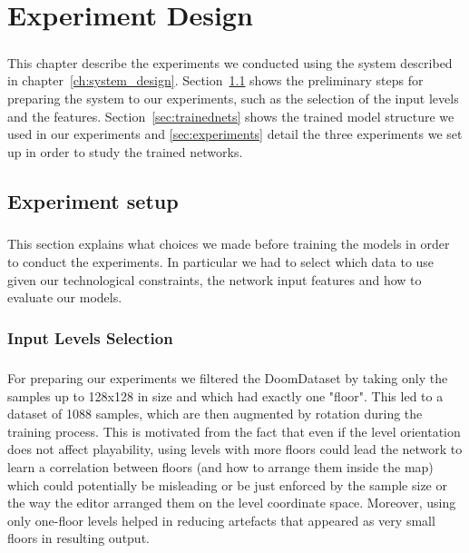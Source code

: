 \chapter{Experiment Design}
\label{ch:experiment}
\paragraph{} This chapter describe the experiments we conducted using the system described in chapter~\ref{ch:system_design}. Section~\ref{sec:experimentdesign} shows the preliminary steps for preparing the system to our experiments, such as the selection of the input levels and the features. Section~\ref{sec:trainednets} shows the trained model structure we used in our experiments and \ref{sec:experiments} detail the three experiments we set up in order to study the trained networks.

\section{Experiment setup}
\label{sec:experimentdesign}
\paragraph{} This section explains what choices we made before training the models in order to conduct the experiments. In particular we had to select which data to use given our technological constraints, the network input features and how to evaluate our models.

\subsection{Input Levels Selection}
\label{sec:InputSelection}
\paragraph{} For preparing our experiments we filtered the DoomDataset by taking only the samples up to 128x128 in size and which had exactly one "floor". This led to a dataset of 1088 samples, which are then augmented by rotation during the training process. This is motivated from the fact that even if the level orientation does not affect playability, using levels with more floors could lead the network to learn a correlation between floors (and how to arrange them inside the map) which could potentially be misleading or be just enforced by the sample size or the way the editor arranged them on the level coordinate space. Moreover, using only one-floor levels helped in reducing artefacts that appeared as very small floors in resulting output.

